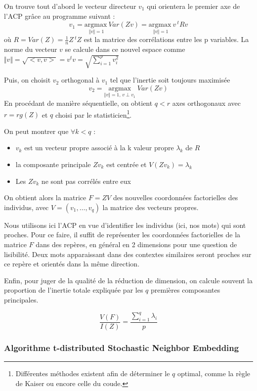 \documentclass[11pt,french,french]{article}
\let\rmarkdownfootnote\footnote%
\def\footnote{\protect\rmarkdownfootnote}
\begin{document}
On trouve tout d'abord le vecteur directeur \(v_1\) qui orientera le
premier axe de l'ACP grâce au programme suivant :
\[v_1 =\underset{\Vert v \Vert = 1}{\mathrm{argmax~}} Var(Zv) =\underset{\Vert v \Vert = 1}{\mathrm{argmax~}} v\,^t R v \]
où \(R = Var(Z) = \frac{1}{n} Z\,^t Z\) est la matrice des corrélations
entre les p variables. La norme du vecteur \(v\) se calcule dans ce
nouvel espace comme
\(\Vert v \Vert = \sqrt{<v,v>} = v ^tv =\sqrt{ \sum \limits_{i = 1}^p v_i^2}\)

Puis, on choisit \(v_2\) orthogonal à \(v_1\) tel que l'inertie soit
toujours maximisée
\[v_2 =\underset{ \Vert v \Vert = 1,\,v \perp v_1}{\mathrm{argmax}}\;  Var(Zv) \]
En procédant de manière séquentielle, on obtient \(q < r\) axes
orthogonaux avec \(r = rg(Z)\) et \(q\) choisi par le
statisticien\footnote{Différentes méthodes existent afin de déterminer
  le \(q\) optimal, comme la règle de Kaiser ou encore celle du coude.}.

On peut montrer que \(\forall k < q\) :

\begin{itemize}
\item $v_k$ est un vecteur propre associé à la k\ieme{} valeur propre $\lambda_k$ de $R$
\item la composante principale $Zv_k$ est centrée et $V(Zv_k)= \lambda_k$
\item Les $Zv_k$ ne sont pas corrélés entre eux
\end{itemize}

On obtient alors la matrice \(F = ZV\) des nouvelles coordonnées
factorielles des individus, avec \(V = (v_1,\dots,v_q)\) la matrice des
vecteurs propres.

Nous utilisons ici l'ACP en vue d'identifier les individus (ici, nos
mots) qui sont proches. Pour ce faire, il suffit de représenter les
coordonnées factorielles de la matrice \(F\) dans des repères, en
général en 2 dimensions pour une question de lisibilité. Deux mots
apparaissant dans des contextes similaires seront proches sur ce repère
et orientés dans la même direction.

Enfin, pour juger de la qualité de la réduction de dimension, on calcule
souvent la proportion de l'inertie totale expliquée par les \(q\)
premières composantes principales.

\[ \frac{V(F)}{I(Z)} = \frac{\sum \limits_{i = 1}^q \lambda_i}{p}\]

\hypertarget{algorithme-t-distributed-stochastic-neighbor-embedding}{%
\subsubsection{Algorithme t-distributed Stochastic Neighbor
Embedding}\label{algorithme-t-distributed-stochastic-neighbor-embedding}}
\end{document}
